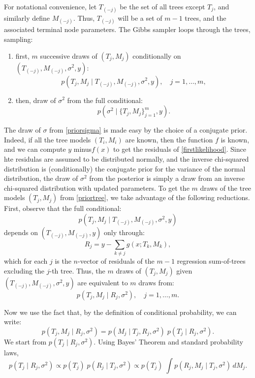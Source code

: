 \documentclass[a4paper,11pt]{article}
\begin{document}
For notational convenience, let \( T_{(-j)} \) be the set of all trees except \( T_j \), and similarly define \( M_{(-j)} \). Thus, \( T_{(-j)} \) will be a set of \( m - 1 \) trees, and the associated terminal node parameters. 
The Gibbs sampler loops through the trees, sampling:
\begin{enumerate}
    \item  first,  \( m \) successive draws of \( (T_j, M_j) \) conditionally on \( (T_{(-j)}, M_{(-j)}, \sigma^2, y) \):
\begin{equation}
p(T_j, M_j \mid T_{(-j)}, M_{(-j)}, \sigma^2, y), \quad j = 1, \ldots, m, \label{priortree}
\end{equation}
\item then,  draw of \( \sigma^2 \) from the full conditional:
\begin{equation}
p\left(\sigma^2 \mid\{T_j, M_j\}_{j=1}^m, y\right). \label{priorsigma}
\end{equation}
\end{enumerate}
The draw of $\sigma$ from \eqref{priorsigma} is made easy by the choice of a conjugate prior. Indeed, if all the tree models $(T_i, M_i)$ are known, then the function $f$ is known, and we can compute $y$ minus$ f(x)$ to get the residuals of \eqref{firstlikelihood}. Since hte residulas are assumed to be distributed normally, and the inverse chi-squared distribution is (conditionally) the conjugate prior for the variance of the normal distribution, the draw of \( \sigma^2 \) from the posterior is simply a draw from an inverse chi-squared distribution with updated parameters. 
To get the \( m \) draws of the tree models \( (T_j, M_j) \) from \eqref{priortree}, we take advantage of the following reductions. First, observe that the full conditional:
\[
p\left(T_j, M_j \mid T_{(-j)}, M_{(-j)}, \sigma^2, y\right)
\]
depends on \( (T_{(-j)}, M_{(-j)}, y) \) only through:
\begin{equation}
R_j = y - \sum_{k \neq j} g(x; T_k, M_k), \label{residual}
\end{equation}
which for each $j$ is the $n$-vector of residuals of the $m-1$ regression sum-of-trees excluding the \( j \)-th tree. Thus, the \( m \) draws of \( (T_j, M_j) \) given \( (T_{(-j)}, M_{(-j)}, \sigma^2, y) \) are equivalent to \( m \) draws from:
\begin{equation}
p(T_j, M_j \mid R_j, \sigma^2), \quad j = 1, \ldots, m. \label{13}
\end{equation}

Now we use the fact that, by the definition of conditional probability, we can write:
\[
p(T_j, M_j \mid R_j, \sigma^2) = p(M_j \mid T_j, R_j, \sigma^2) \; p(T_j \mid R_j, \sigma^2).
\]
We start from \( p(T_j \mid R_j, \sigma^2) \). Using Bayes' Theorem and standard probability laws, 
\[
p(T_j \mid R_j, \sigma^2) \propto p(T_j) \; p(R_j \mid T_j, \sigma^2) 
\propto p(T_j) \; \int p(R_j, M_j \mid T_j, \sigma^2) \, dM_j.
\]
\end{document}
